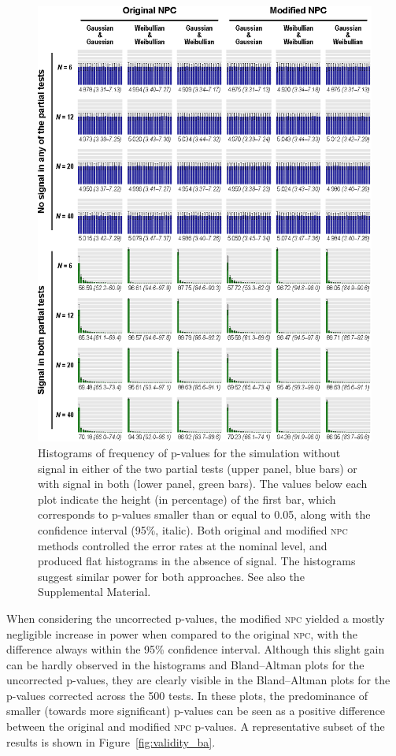 \begin{figure}[p]
\begin{center}
\centerline{\includegraphics{images/validity_hist.eps}}
\end{center}
\vspace{-3mm}
\caption{Histograms of frequency of p-values for the simulation without signal in either of the two partial tests (upper panel, blue bars) or with signal in both (lower panel, green bars). The values below each plot indicate the height (in percentage) of the first bar, which corresponds to p-values smaller than or equal to 0.05, along with the confidence interval (95\%, italic). Both original and modified \textsc{npc} methods controlled the error rates at the nominal level, and produced flat histograms in the absence of signal. The histograms suggest similar power for both approaches. See also the Supplemental Material.}
\label{fig:validity_hist}
\end{figure}

When considering the uncorrected p-values, the modified \textsc{npc} yielded a mostly negligible increase in power when compared to the original \textsc{npc}, with the difference always within the 95\% confidence interval. Although this slight gain can be hardly observed in the histograms and Bland--Altman plots for the uncorrected p-values, they are clearly visible in the Bland--Altman plots for the p-values corrected across the 500 tests. In these plots, the predominance of smaller (towards more significant) p-values can be seen as a positive difference between the original and modified \textsc{npc} p-values. A representative subset of the results is shown in Figure~\ref{fig:validity_ba}.

